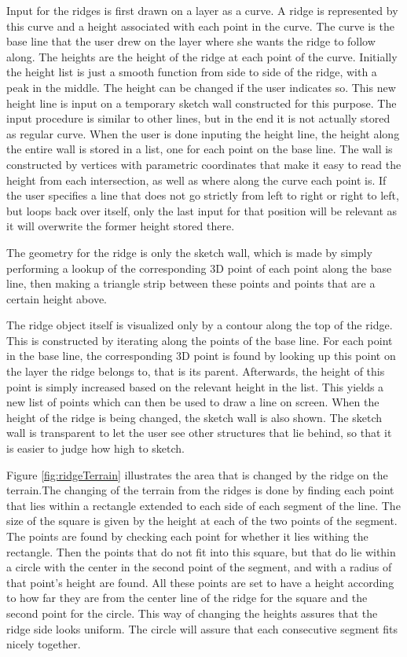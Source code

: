 \documentclass[a4paper,12pt]{report}
\begin{document}
Input for the ridges is first drawn on a layer as a curve. A ridge is represented by this curve and a height associated with each point in the curve. The curve is the base line that the user drew on the layer where she wants the ridge to follow along. The heights are the height of the ridge at each point of the curve. Initially the height list is just a smooth function from side to side of the ridge, with a peak in the middle. The height can be changed if the user indicates so. This new height line is input on a temporary sketch wall constructed for this purpose. The input procedure is similar to other lines, but in the end it is not actually stored as regular curve. When the user is done inputing the height line, the height along the entire wall is stored in a list, one for each point on the base line. The wall is constructed by vertices with parametric coordinates that make it easy to read the height from each intersection, 
as 
well as where along the curve each point is. If the user specifies a line that does not go strictly from left to right or right to left, but loops back over itself, only the last input for that position will be relevant as it will overwrite the former height stored there.

The geometry for the ridge is only the sketch wall, which is made by simply performing a lookup of the corresponding 3D point of each point along the base line, then making a triangle strip between these points and points that are a certain height above.

The ridge object itself is visualized only by a contour along the top of the ridge. This is constructed by iterating along the points of the base line. For each point in the base line, the corresponding 3D point is found by looking up this point on the layer the ridge belongs to, that is its parent. Afterwards, the height of this point is simply increased based on the relevant height in the list. This yields a new list of points which can then be used to draw a line on screen. When the height of the ridge is being changed, the sketch wall is also shown. The sketch wall is transparent to let the user see other structures that lie behind, so that it is easier to judge how high to sketch.

Figure \ref{fig:ridgeTerrain} illustrates the area that is changed by the ridge on the terrain.The changing of the terrain from the ridges is done by finding each point that lies within a rectangle extended to each side of each segment of the line. The size of the square is given by the height at each of the two points of the segment. The points are found by checking each point for whether it lies withing the rectangle. Then the points that do not fit into this square, but that do lie within a circle with the center in the second point of the segment, and with a radius of that point's height are found. All these points are set to have a height according to how far they are from the center line of the ridge for the square and the second point for the circle. This way of changing the heights assures that the ridge side looks uniform. The circle will assure that each consecutive segment fits nicely together.
\end{document}
